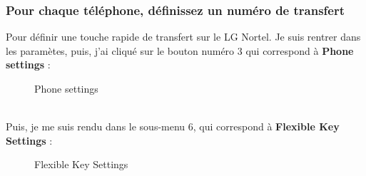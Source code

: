 \documentclass[12pt, a4paper]{article}
\begin{document}
	\newpage
	\subsubsection{Pour chaque téléphone, définissez un numéro de transfert}
	Pour définir une touche rapide de transfert sur le LG Nortel. Je suis 
	rentrer dans les paramètes, puis, j'ai cliqué sur le bouton numéro 
	3 qui correspond à \textbf{Phone settings} : 
	\begin{figure}[h]
		\centering
		\caption{Phone settings}
		\label{fig:btnt}
	\end{figure}\\
	Puis, je me suis rendu dans le sous-menu 6, qui correspond à 
	\textbf{Flexible Key Settings} : 
	\begin{figure}[h]
		\centering
		\caption{Flexible Key Settings}
		\label{fig:btnk}
	\end{figure}\\[2cm]
\end{document}
